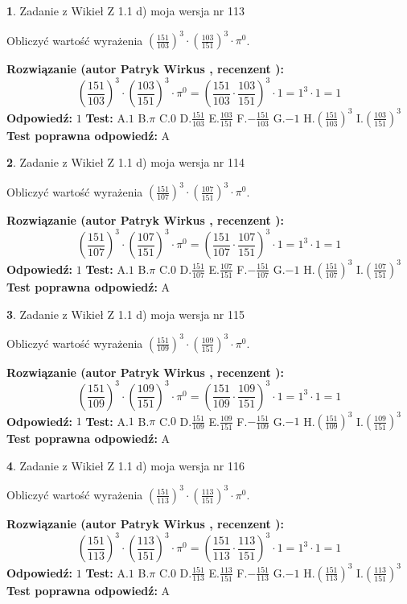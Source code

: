 \documentclass[12pt, a4paper]{article}
\theoremstyle{definition} %
\newtheorem{zad}{}
\newcommand{\zadStart}[1]{\begin{zad}#1\newline}
\newcommand{\zadStop}{\end{zad}}
\newcommand{\rozwStart}[2]{\noindent \textbf{Rozwiązanie (autor #1 , recenzent #2): }\newline}
\newcommand{\rozwStop}{\newline}
\newcommand{\odpStart}{\noindent \textbf{Odpowiedź:}\newline}
\newcommand{\odpStop}{\newline}
\newcommand{\testStart}{\noindent \textbf{Test:}\newline}
\newcommand{\testStop}{\newline}
\newcommand{\kluczStart}{\noindent \textbf{Test poprawna odpowiedź:}\newline}
\newcommand{\kluczStop}{\newline}
\begin{document}
\zadStart{Zadanie z Wikieł Z 1.1 d) moja wersja nr 113}

Obliczyć wartość wyrażenia $(\frac{151}{103})^{3} \cdot (\frac{103}{151})^{3} \cdot \pi^{0}$.
\zadStop
\rozwStart{Patryk Wirkus}{}
$$(\frac{151}{103})^{3} \cdot (\frac{103}{151})^{3} \cdot \pi^{0} = (\frac{151}{103} \cdot \frac{103}{151})^{3} \cdot 1 = 1^{3} \cdot 1 = 1$$
\rozwStop
\odpStart
$1$
\odpStop
\testStart
A.$1$ B.$\pi$ C.$0$ D.$\frac{151}{103}$ E.$\frac{103}{151}$
F.$-\frac{151}{103}$ G.$-1$
H.$(\frac{151}{103})^{3}$
I.$(\frac{103}{151})^{3}$
\testStop
\kluczStart
A
\kluczStop



\zadStart{Zadanie z Wikieł Z 1.1 d) moja wersja nr 114}

Obliczyć wartość wyrażenia $(\frac{151}{107})^{3} \cdot (\frac{107}{151})^{3} \cdot \pi^{0}$.
\zadStop
\rozwStart{Patryk Wirkus}{}
$$(\frac{151}{107})^{3} \cdot (\frac{107}{151})^{3} \cdot \pi^{0} = (\frac{151}{107} \cdot \frac{107}{151})^{3} \cdot 1 = 1^{3} \cdot 1 = 1$$
\rozwStop
\odpStart
$1$
\odpStop
\testStart
A.$1$ B.$\pi$ C.$0$ D.$\frac{151}{107}$ E.$\frac{107}{151}$
F.$-\frac{151}{107}$ G.$-1$
H.$(\frac{151}{107})^{3}$
I.$(\frac{107}{151})^{3}$
\testStop
\kluczStart
A
\kluczStop



\zadStart{Zadanie z Wikieł Z 1.1 d) moja wersja nr 115}

Obliczyć wartość wyrażenia $(\frac{151}{109})^{3} \cdot (\frac{109}{151})^{3} \cdot \pi^{0}$.
\zadStop
\rozwStart{Patryk Wirkus}{}
$$(\frac{151}{109})^{3} \cdot (\frac{109}{151})^{3} \cdot \pi^{0} = (\frac{151}{109} \cdot \frac{109}{151})^{3} \cdot 1 = 1^{3} \cdot 1 = 1$$
\rozwStop
\odpStart
$1$
\odpStop
\testStart
A.$1$ B.$\pi$ C.$0$ D.$\frac{151}{109}$ E.$\frac{109}{151}$
F.$-\frac{151}{109}$ G.$-1$
H.$(\frac{151}{109})^{3}$
I.$(\frac{109}{151})^{3}$
\testStop
\kluczStart
A
\kluczStop



\zadStart{Zadanie z Wikieł Z 1.1 d) moja wersja nr 116}

Obliczyć wartość wyrażenia $(\frac{151}{113})^{3} \cdot (\frac{113}{151})^{3} \cdot \pi^{0}$.
\zadStop
\rozwStart{Patryk Wirkus}{}
$$(\frac{151}{113})^{3} \cdot (\frac{113}{151})^{3} \cdot \pi^{0} = (\frac{151}{113} \cdot \frac{113}{151})^{3} \cdot 1 = 1^{3} \cdot 1 = 1$$
\rozwStop
\odpStart
$1$
\odpStop
\testStart
A.$1$ B.$\pi$ C.$0$ D.$\frac{151}{113}$ E.$\frac{113}{151}$
F.$-\frac{151}{113}$ G.$-1$
H.$(\frac{151}{113})^{3}$
I.$(\frac{113}{151})^{3}$
\testStop
\kluczStart
A
\kluczStop
\end{document}

